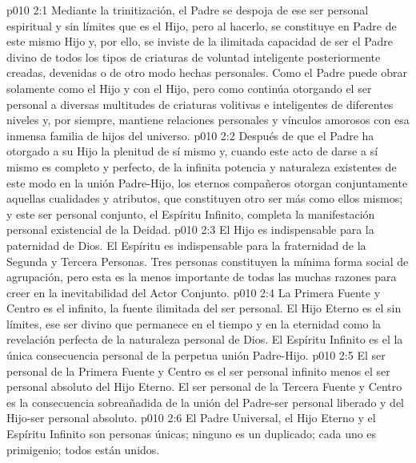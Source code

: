 \vs p010 2:1 Mediante la trinitización, el Padre se despoja de ese ser personal espiritual y sin límites que es el Hijo, pero al hacerlo, se constituye en Padre de este mismo Hijo y, por ello, se inviste de la ilimitada capacidad de ser el Padre divino de todos los tipos de criaturas de voluntad inteligente posteriormente creadas, devenidas o de otro modo hechas personales. Como  el Padre puede obrar solamente como el Hijo y con el Hijo, pero como  continúa otorgando el ser personal a diversas multitudes de criaturas volitivas e inteligentes de diferentes niveles y, por siempre, mantiene relaciones personales y vínculos amorosos con esa inmensa familia de hijos del universo.
\vs p010 2:2 Después de que el Padre ha otorgado a su Hijo la plenitud de sí mismo y, cuando este acto de darse a sí mismo es completo y perfecto, de la infinita potencia y naturaleza existentes de este modo en la unión Padre\hyp{}Hijo, los eternos compañeros otorgan conjuntamente aquellas cualidades y atributos, que constituyen otro ser más como ellos mismos; y este ser personal conjunto, el Espíritu Infinito, completa la manifestación personal existencial de la Deidad.
\vs p010 2:3 El Hijo es indispensable para la paternidad de Dios. El Espíritu es indispensable para la fraternidad de la Segunda y Tercera Personas. Tres personas constituyen la mínima forma social de agrupación, pero esta es la menos importante de todas las muchas razones para creer en la inevitabilidad del Actor Conjunto.
\vs p010 2:4 \pc La Primera Fuente y Centro es el  infinito, la fuente ilimitada del ser personal. El Hijo Eterno es el  sin límites, ese ser divino que permanece en el tiempo y en la eternidad como la revelación perfecta de la naturaleza personal de Dios. El Espíritu Infinito es el  la única consecuencia personal de la perpetua unión Padre\hyp{}Hijo.
\vs p010 2:5 \pc El ser personal de la Primera Fuente y Centro es el ser personal infinito menos el ser personal absoluto del Hijo Eterno. El ser personal de la Tercera Fuente y Centro es la consecuencia sobreañadida de la unión del Padre\hyp{}ser personal liberado y del Hijo\hyp{}ser personal absoluto.
\vs p010 2:6 \pc El Padre Universal, el Hijo Eterno y el Espíritu Infinito son personas únicas; ninguno es un duplicado; cada uno es primigenio; todos están unidos.
